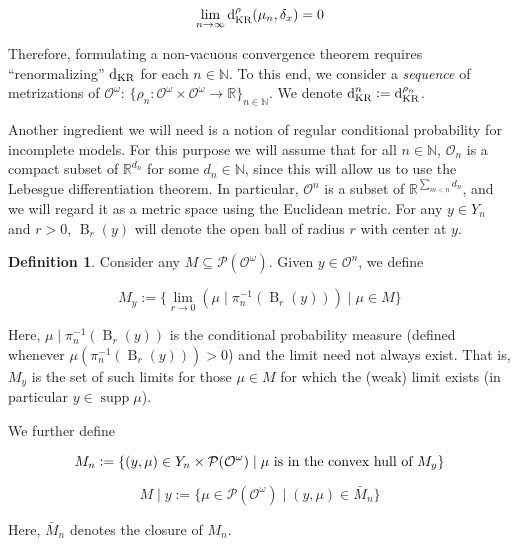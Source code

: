 \documentclass[11pt]{article}
\theoremstyle{definition}
\newtheorem{definition}{Definition}%
\theoremstyle{plain}
\newcommand{\Nats}{\mathbb{N}}
\newcommand{\Reals}{\mathbb{R}}
\newcommand{\Sq}[2]{\{#1\}_{#2 \in \Nats}}
\newcommand{\Sqn}[1]{\Sq{#1}{n}}
\newcommand{\B}{\operatorname{B}}
\newcommand{\PM}{\mathcal{P}}
\DeclareMathOperator{\Sp}{supp}
\newcommand{\DKR}{\operatorname{d}_{\textnormal{KR}}}
\newcommand{\Ob}{\mathcal{O}}
\newcommand{\OO}{\Ob^\omega}
\newcommand{\PMO}{\PM(\OO)}
\begin{document}
\begin{equation}
\lim_{n \rightarrow \infty} \DKR^\rho(\mu_n, \delta_x) = 0
\end{equation}

Therefore, formulating a non-vacuous convergence theorem requires \enquote{renormalizing} $\DKR$ for each $n \in \Nats$. To this end, we consider a \emph{sequence} of metrizations of $\OO$: $\Sqn{\rho_n: \OO \times \OO \rightarrow \Reals}$. We denote $\DKR^n:=\DKR^{\rho_n}$.

Another ingredient we will need is a notion of regular conditional probability for incomplete models. For this purpose we will assume that for all $n \in \Nats$, $\Ob_n$ is a compact subset of $\Reals^{d_n}$ for some $d_n \in \Nats$, since this will allow us to use the Lebesgue differentiation theorem. In particular, $\Ob^n$ is a subset of $\Reals^{\sum_{m < n} d_n}$, and we will regard it as a metric space using the Euclidean metric. For any $y \in Y_n$ and $r > 0$, $\B_r(y)$ will denote the open ball of radius $r$ with center at $y$.

\begin{samepage}
\begin{definition}

Consider any $M \subseteq \PMO$. Given $y \in \Ob^n$, we define

\begin{equation}
M_y:=\{\lim_{r \rightarrow 0}{(\mu \mid \pi_n^{-1}(\B_r(y)))} \mid \mu \in M\}
\end{equation}

Here, $\mu \mid \pi_n^{-1}(\B_r(y))$ is the conditional probability measure (defined whenever $\mu(\pi_n^{-1}(\B_r(y))) > 0$) and the limit need not always exist. That is, $M_y$ is the set of such limits for those $\mu \in M$ for which the (weak) limit exists (in particular $y \in \Sp{\mu}$).

We further define

\begin{equation}
M_n:=\{(y,\mu) \in Y_n \times \PMO \mid \mu \textnormal{ is in the convex hull of } M_y\}
\end{equation}

\begin{equation}
M \mid y:=\{\mu \in \PMO \mid (y,\mu) \in \bar{M}_n\}
\end{equation}

Here, $\bar{M}_n$ denotes the closure of $M_n$.

\end{definition}
\end{samepage}
\end{document}
